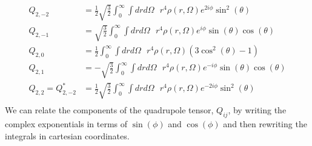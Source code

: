 \documentclass[]{article}
\begin{document}
\begin{enumerate}[c)]
\begin{equation}
\begin{split}
Q_{2,-2} & = \frac{1}{2}\sqrt{\frac{3}{2}} \int_{0}^{\infty}\int dr d\Omega \text{ } r^4 \rho(r,\Omega)e^{2 i \phi } \sin ^2(\theta ) \\
Q_{2,-1} & = \sqrt{\frac{3}{2}}  \int_{0}^{\infty}\int dr d\Omega \text{ }  r^4 \rho(r,\Omega)e^{ i \phi }  \sin (\theta ) \cos (\theta )\\
Q_{2,0} & = \frac{1}{2} \int_{0}^{\infty}\int dr d\Omega \text{ } r^4 \rho(r,\Omega)  \left(3 \cos ^2(\theta )-1\right) \\
Q_{2,1} & = -\sqrt{\frac{3}{2}}  \int_{0}^{\infty}\int dr d\Omega \text{ } r^4 \rho(r,\Omega)e^{- i \phi }  \sin (\theta ) \cos (\theta )\\
Q_{2,2}  = Q_{2,-2}^* & =  \frac{1}{2}\sqrt{\frac{3}{2}} \int_{0}^{\infty}\int dr d\Omega \text{ } r^4 \rho(r,\Omega)e^{-2 i \phi } \sin ^2(\theta ) \\
\end{split}
\end{equation}
We can relate the components of the quadrupole tensor, $Q_{ij}$, by writing the complex exponentials in terms of $\sin(\phi)$ and $\cos(\phi)$ and then rewriting the integrals in cartesian coordinates.


\end{enumerate}
\end{document}
